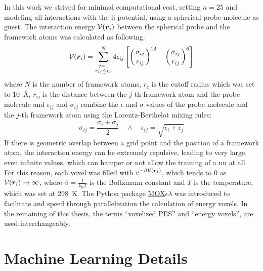 In this work we strived for minimal computational cost, setting $n=\num{25}$ and
modeling all interactions with the \gls{lj} potential, using a spherical probe molecule as guest.
The interaction energy $\mathcal{V}(\boldsymbol{r}_i)$ between the spherical probe and the
framework atoms was calculated as following:
\begin{equation}
	\label{eq:lj_potential}
	\mathcal{V}(\boldsymbol{r}_i) =
	\sum_{\substack{j=1 \\ r_{ij} \leq r_\mathrm{c}}}^N 4\epsilon_{ij}
	\left[
		\left(\frac{\sigma_{ij}}{r_{ij}}\right)^{12}
		- 
		\left(\frac{\sigma_{ij}}{r_{ij}}\right)^{6}
	\right]
\end{equation}
where $N$ is the number of framework atoms, $r_\mathrm{c}$ is the cutoff
radius which was set to \SI{10}{\angstrom}, $r_{ij}$ is the
distance between the $j$-th framework atom and the probe molecule and
$\epsilon_{ij}$ and $\sigma_{ij}$ combine the $\epsilon$ and $\sigma$ values of
the probe molecule and the $j$-th framework atom using the Lorentz-Berthelot
mixing rules:
\begin{equation}
	\sigma_{ij} = \frac{\sigma_i + \sigma_j}{2}
	\quad
	\land
	\quad
	\epsilon_{ij} = \sqrt{\epsilon_i + \epsilon_j}
\end{equation}
If there is geometric overlap between a grid point and the position of a
framework atom, the interaction energy can be extremely repulsive, leading to
very large, even infinite values, which can hamper or not allow the training of
a \gls{nn} at all. For this reason, each voxel was filled with
$e^{-\beta\mathcal{V}(\boldsymbol{r}_i)}$, which tends to \num{0} as $\mathcal{V}(\boldsymbol{r}_i) \to
\infty$, where $\beta = \frac{1}{k_\mathrm{B}T}$ is the Boltzmann
constant and $T$ is the
temperature, which was set at \SI{298}{\kelvin}. The Python
package
\href{https://github.com/frudakis-research-group/moxel}{MOX$\epsilon\lambda$}
was introduced to facilitate and speed through
parallelization the calculation of energy voxels. In the
remaining of this thesis, the terms ``voxelized PES'' and ``energy
voxels'', are used interchangeably.

\section{Machine Learning Details}
\label{sec:ml_details}

